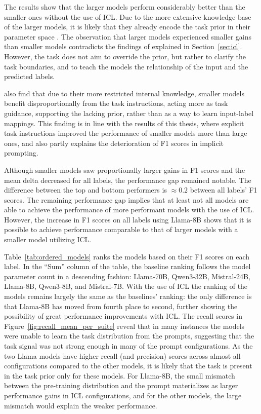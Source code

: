\documentclass[english, 12pt, a4paper, sci, utf8, a-2b, online]{latex/definitions/aaltothesis}
\begin{document}
The results show that the larger models perform considerably better than the smaller ones without the use of ICL. Due to the more extensive knowledge base of the larger models, it is likely that they already encode the task prior in their parameter space \cite{wei2023largerlanguagemodelsincontext}. The observation that larger models experienced smaller gains than smaller models contradicts the findings of \textcite{wei2023largerlanguagemodelsincontext} explained in Section~\ref{sec:icl}. However, the task does not aim to override the prior, but rather to clarify the task boundaries, and to teach the models the relationship of the input and the predicted labels.

\textcite{wei2023largerlanguagemodelsincontext} also find that due to their more restricted internal knowledge, smaller models benefit disproportionally from the task instructions, acting more as task guidance, supporting the lacking prior, rather than as a way to learn input-label mappings. This finding is in line with the results of this thesis, where explicit task instructions improved the performance of smaller models more than large ones, and also partly explains the deterioration of F1 scores in implicit prompting.

Although smaller models saw proportionally larger gains in F1 scores and the mean delta decreased for all labels, the performance gap remained notable. The difference between the top and bottom performers is $\approx 0.2$ between all labels' F1 scores. The remaining performance gap implies that at least not all models are able to achieve the performance of more performant models with the use of ICL. However, the increase in F1 scores on all labels using Llama-8B shows that it is possible to achieve performance comparable to that of larger models with a smaller model utilizing ICL.

Table~\ref{tab:ordered_models} ranks the models based on their F1 scores on each label. In the ``Sum'' column of the table, the baseline ranking follows the model parameter count in a descending fashion: Llama-70B, Qwen3-32B, Mistral-24B, Llama-8B, Qwen3-8B, and Mistral-7B. With the use of ICL the ranking of the models remains largely the same as the baselines' ranking: the only difference is that Llama-8B has moved from fourth place to second, further showing the possibility of great performance improvements with ICL. The recall scores in Figure~\ref{fig:recall_mean_per_suite} reveal that in many instances the models were unable to learn the task distribution from the prompts, suggesting that the task signal was not strong enough in many of the prompt configurations. As the two Llama models have higher recall (and precision) scores across almost all configurations compared to the other models, it is likely that the task is present in the task prior only for these models. For Llama-8B, the small mismatch between the pre-training distribution and the prompt materializes as larger performance gains in ICL configurations, and for the other models, the large mismatch would explain the weaker performance.
\end{document}
